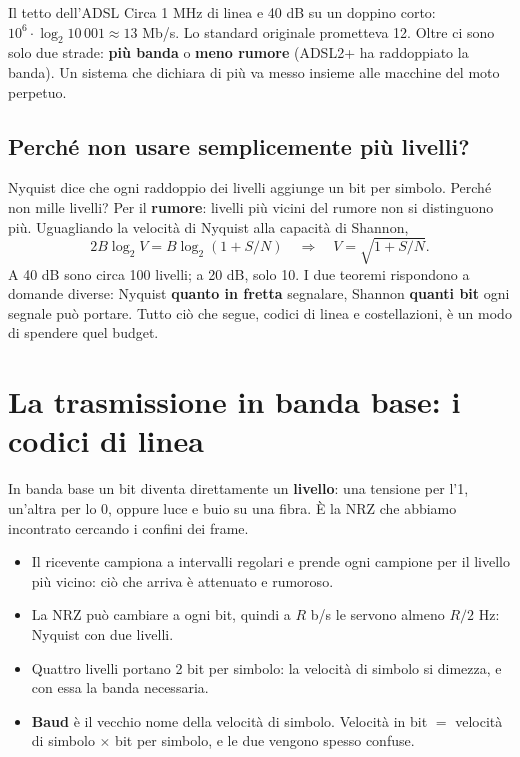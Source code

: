 
\begin{esempio}{Il tetto dell'ADSL}
Circa 1 MHz di linea e 40 dB su un doppino corto: $10^6 \cdot \log_2 10\,001 \approx 13$ Mb/s. Lo standard originale prometteva 12.
Oltre ci sono solo due strade: \textbf{più banda} o \textbf{meno rumore} (ADSL2+ ha raddoppiato la banda). Un sistema che dichiara di
più va messo insieme alle macchine del moto perpetuo.
\end{esempio}

\subsection{Perché non usare semplicemente più livelli?}

Nyquist dice che ogni raddoppio dei livelli aggiunge un bit per simbolo. Perché non mille livelli? Per il \textbf{rumore}: livelli più
vicini del rumore non si distinguono più. Uguagliando la velocità di Nyquist alla capacità di Shannon,
$$2B \log_2 V = B \log_2 (1 + S/N) \quad\Longrightarrow\quad V = \sqrt{1 + S/N}.$$
A 40 dB sono circa 100 livelli; a 20 dB, solo 10. I due teoremi rispondono a domande diverse: Nyquist \textbf{quanto in fretta}
segnalare, Shannon \textbf{quanti bit} ogni segnale può portare. Tutto ciò che segue, codici di linea e costellazioni, è un modo di
spendere quel budget.

\section{La trasmissione in banda base: i codici di linea}

In banda base un bit diventa direttamente un \textbf{livello}: una tensione per l'1, un'altra per lo 0, oppure luce e buio su una fibra.
È la NRZ che abbiamo incontrato cercando i confini dei frame.

\begin{itemize}
    \item Il ricevente campiona a intervalli regolari e prende ogni campione per il livello più vicino: ciò che arriva è attenuato e
          rumoroso.
    \item La NRZ può cambiare a ogni bit, quindi a $R$ b/s le servono almeno $R/2$ Hz: Nyquist con due livelli.
    \item Quattro livelli portano 2 bit per simbolo: la velocità di simbolo si dimezza, e con essa la banda necessaria.
    \item \textbf{Baud} è il vecchio nome della velocità di simbolo. Velocità in bit $=$ velocità di simbolo $\times$ bit per simbolo, e
          le due vengono spesso confuse.
\end{itemize}

